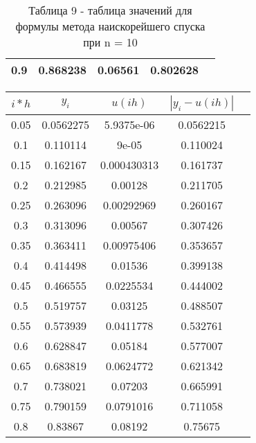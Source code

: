 \documentclass[a4paper,12pt]{article}
\begin{document}
{\begin{enumerate}[label = \arabic*.]
{\begin{table}[h]
\begin{tabular}{|c|c|c|c|c|}
            \hline
            0.9 &     0.868238 &      0.06561 &     0.802628\\
            \hline
          \end{tabular}
          \caption*{\small{Таблица 9 - таблица значений для формулы метода наискорейшего спуска при n = 10}}
        \end{table}
        \begin{table}[h]
          \centering
          \begin{tabular}{|c|c|c|c|c|}
            \hline
            $i*h$ & $y_i$ & $u(ih)$ & $\left|y_i-u(ih)\right|$\\
            \hline
            0.05 &    0.0562275 &   5.9375e-06 &    0.0562215\\
            \hline
            0.1 &     0.110114 &        9e-05 &     0.110024\\
            \hline
            0.15 &     0.162167 &  0.000430313 &     0.161737\\
            \hline
            0.2 &     0.212985 &      0.00128 &     0.211705\\
            \hline
            0.25 &     0.263096 &   0.00292969 &     0.260167\\
            \hline
            0.3 &     0.313096 &      0.00567 &     0.307426\\
            \hline
            0.35 &     0.363411 &   0.00975406 &     0.353657\\
            \hline
            0.4 &     0.414498 &      0.01536 &     0.399138\\
            \hline
            0.45 &     0.466555 &    0.0225534 &     0.444002\\
            \hline
            0.5 &     0.519757 &      0.03125 &     0.488507\\
            \hline
            0.55 &     0.573939 &    0.0411778 &     0.532761\\
            \hline
            0.6 &     0.628847 &      0.05184 &     0.577007\\
            \hline
            0.65 &     0.683819 &    0.0624772 &     0.621342\\
            \hline
            0.7 &     0.738021 &      0.07203 &     0.665991\\
            \hline
            0.75 &     0.790159 &    0.0791016 &     0.711058\\
            \hline
            0.8 &      0.83867 &      0.08192 &      0.75675\\

\end{tabular}
\end{table}}
\end{enumerate}}
\end{document}
